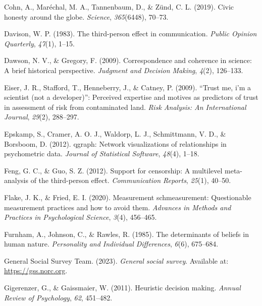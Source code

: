 \documentclass[
  ,jou,floatsintext]{apa6}
\newlength{\cslhangindent}
\newlength{\cslentryspacingunit} %
\newenvironment{CSLReferences}[2] %
 {%
  \setlength{\parindent}{0pt}
  \ifodd #1
  \let\oldpar\par
  \def\par{\hangindent=\cslhangindent\oldpar}
  \fi
  \setlength{\parskip}{#2\cslentryspacingunit}
 }%
 {}
\begin{document}
\begin{CSLReferences}{1}{0}
\leavevmode{}%
Cohn, A., Maréchal, M. A., Tannenbaum, D., \& Zünd, C. L. (2019). Civic honesty around the globe. \emph{Science}, \emph{365}(6448), 70--73.

\leavevmode{}%
Davison, W. P. (1983). The third-person effect in communication. \emph{Public Opinion Quarterly}, \emph{47}(1), 1--15.

\leavevmode{}%
Dawson, N. V., \& Gregory, F. (2009). Correspondence and coherence in science: A brief historical perspective. \emph{Judgment and Decision Making}, \emph{4}(2), 126--133.

\leavevmode{}%
Eiser, J. R., Stafford, T., Henneberry, J., \& Catney, P. (2009). {``Trust me, i'm a scientist (not a developer)''}: Perceived expertise and motives as predictors of trust in assessment of risk from contaminated land. \emph{Risk Analysis: An International Journal}, \emph{29}(2), 288--297.

\leavevmode{}%
Epskamp, S., Cramer, A. O. J., Waldorp, L. J., Schmittmann, V. D., \& Borsboom, D. (2012). {qgraph}: Network visualizations of relationships in psychometric data. \emph{Journal of Statistical Software}, \emph{48}(4), 1--18.

\leavevmode{}%
Feng, G. C., \& Guo, S. Z. (2012). Support for censorship: A multilevel meta-analysis of the third-person effect. \emph{Communication Reports}, \emph{25}(1), 40--50.

\leavevmode{}%
Flake, J. K., \& Fried, E. I. (2020). Measurement schmeasurement: Questionable measurement practices and how to avoid them. \emph{Advances in Methods and Practices in Psychological Science}, \emph{3}(4), 456--465.

\leavevmode{}%
Furnham, A., Johnson, C., \& Rawles, R. (1985). The determinants of beliefs in human nature. \emph{Personality and Individual Differences}, \emph{6}(6), 675--684.

\leavevmode{}%
General Social Survey Team. (2023). \emph{General social survey}. Available at: \url{https://gss.norc.org}.

\leavevmode{}%
Gigerenzer, G., \& Gaissmaier, W. (2011). Heuristic decision making. \emph{Annual Review of Psychology}, \emph{62}, 451--482.


\end{CSLReferences}
\end{document}
